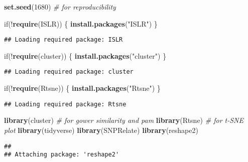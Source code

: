 \documentclass[]{article}
\newenvironment{Shaded}{\begin{snugshade}}{\end{snugshade}}
\newcommand{\KeywordTok}[1]{\textcolor[rgb]{0.13,0.29,0.53}{\textbf{{#1}}}}
\newcommand{\DecValTok}[1]{\textcolor[rgb]{0.00,0.00,0.81}{{#1}}}
\newcommand{\StringTok}[1]{\textcolor[rgb]{0.31,0.60,0.02}{{#1}}}
\newcommand{\CommentTok}[1]{\textcolor[rgb]{0.56,0.35,0.01}{\textit{{#1}}}}
\newcommand{\NormalTok}[1]{{#1}}
\begin{document}
\begin{Shaded}
\begin{Highlighting}[]
\KeywordTok{set.seed}\NormalTok{(}\DecValTok{1680}\NormalTok{) }\CommentTok{# for reproducibility}

\NormalTok{if(!}\KeywordTok{require}\NormalTok{(ISLR)) \{}
  \KeywordTok{install.packages}\NormalTok{(}\StringTok{"ISLR"}\NormalTok{)}
\NormalTok{\}}
\end{Highlighting}
\end{Shaded}

\begin{verbatim}
## Loading required package: ISLR
\end{verbatim}

\begin{Shaded}
\begin{Highlighting}[]
\NormalTok{if(!}\KeywordTok{require}\NormalTok{(cluster)) \{}
  \KeywordTok{install.packages}\NormalTok{(}\StringTok{"cluster"}\NormalTok{)}
\NormalTok{\}}
\end{Highlighting}
\end{Shaded}

\begin{verbatim}
## Loading required package: cluster
\end{verbatim}

\begin{Shaded}
\begin{Highlighting}[]
\NormalTok{if(!}\KeywordTok{require}\NormalTok{(Rtsne)) \{}
  \KeywordTok{install.packages}\NormalTok{(}\StringTok{"Rtsne"}\NormalTok{)}
\NormalTok{\}}
\end{Highlighting}
\end{Shaded}

\begin{verbatim}
## Loading required package: Rtsne
\end{verbatim}

\begin{Shaded}
\begin{Highlighting}[]
\KeywordTok{library}\NormalTok{(cluster) }\CommentTok{# for gower similarity and pam}
\KeywordTok{library}\NormalTok{(Rtsne) }\CommentTok{# for t-SNE plot}
\KeywordTok{library}\NormalTok{(tidyverse)}
\KeywordTok{library}\NormalTok{(SNPRelate)}
\KeywordTok{library}\NormalTok{(reshape2)}
\end{Highlighting}
\end{Shaded}

\begin{verbatim}
## 
## Attaching package: 'reshape2'
\end{verbatim}
\end{document}
